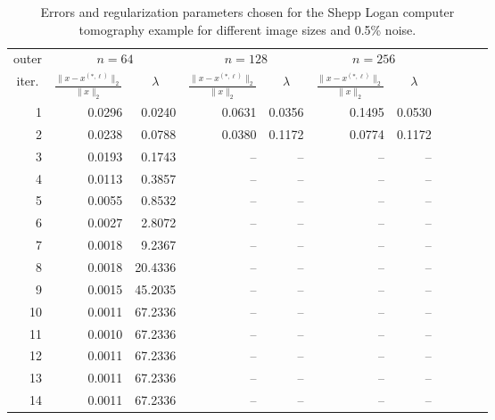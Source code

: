 \begin{table}[htp]
\caption{Errors and regularization parameters chosen for the Shepp Logan computer tomography example for different image sizes and 0.5\% noise.}
\begin{center}
\begin{tabular}{|r|r|r|r|r|r|r|r|r|r|r|}
\hline
\multicolumn{1}{|c|}{outer} & \multicolumn{2}{c|}{$n = 64$} & \multicolumn{2}{c|}{$n = 128$} & \multicolumn{2}{c|}{$n = 256$} \\\cline{2-7}
\multicolumn{1}{|c|}{iter.} & \multicolumn{1}{c|}{$\frac{\|x - x^{(*,\ell)}\|_2}{\|x\|_2}$}& \multicolumn{1}{c|}{$\lambda$} & \multicolumn{1}{c|}{$\frac{\|x - x^{(*,\ell)}\|_2}{\|x\|_2}$} & \multicolumn{1}{c|}{$\lambda$} & \multicolumn{1}{c|}{$\frac{\|x - x^{(*,\ell)}\|_2}{\|x\|_2}$} & \multicolumn{1}{c|}{$\lambda$} \\
\hline
1 & 0.0296 & 0.0240 & 0.0631 & 0.0356 & 0.1495 & 0.0530 \\
2 & 0.0238 & 0.0788 & 0.0380 & 0.1172 & 0.0774 & 0.1172 \\
3 & 0.0193 & 0.1743 & -- & -- & -- & -- \\
4 & 0.0113 & 0.3857 & -- & -- & -- & -- \\
5 & 0.0055 & 0.8532 & -- & -- & -- & -- \\
6 & 0.0027 & 2.8072 & -- & -- & -- & -- \\
7 & 0.0018 & 9.2367 & -- & -- & -- & -- \\
8 & 0.0018 & 20.4336 & -- & -- & -- & -- \\
9 & 0.0015 & 45.2035 & -- & -- & -- & -- \\
10 & 0.0011 & 67.2336 & -- & -- & -- & -- \\
11 & 0.0010 & 67.2336 & -- & -- & -- & -- \\
12 & 0.0011 & 67.2336 & -- & -- & -- & -- \\
13 & 0.0011 & 67.2336 & -- & -- & -- & -- \\
14 & 0.0011 & 67.2336 & -- & -- & -- & -- \\
\hline
\end{tabular}
\end{center}
\label{tab:full_angle_errs_and_reg_params}
\end{table}%

